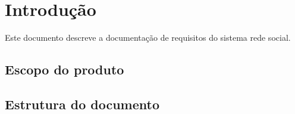 \chapter{Introdução}
	
Este documento descreve a documentação de requisitos do sistema rede social.

\section{Escopo do produto}

\section{Estrutura do documento}